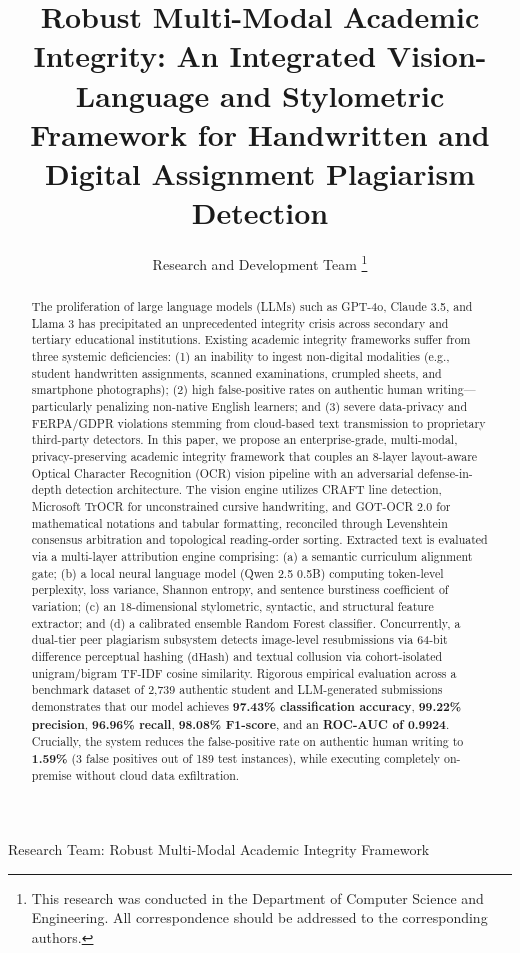 \documentclass[journal]{IEEEtran}
\begin{document}
\title{Robust Multi-Modal Academic Integrity: An Integrated Vision-Language and Stylometric Framework for Handwritten and Digital Assignment Plagiarism Detection}

\author{Research and Development Team%
\thanks{This research was conducted in the Department of Computer Science and Engineering. All correspondence should be addressed to the corresponding authors.}
}

%
{Research Team: Robust Multi-Modal Academic Integrity Framework}

\maketitle

\begin{abstract}
The proliferation of large language models (LLMs) such as GPT-4o, Claude 3.5, and Llama 3 has precipitated an unprecedented integrity crisis across secondary and tertiary educational institutions. Existing academic integrity frameworks suffer from three systemic deficiencies: (1) an inability to ingest non-digital modalities (e.g., student handwritten assignments, scanned examinations, crumpled sheets, and smartphone photographs); (2) high false-positive rates on authentic human writing---particularly penalizing non-native English learners; and (3) severe data-privacy and FERPA/GDPR violations stemming from cloud-based text transmission to proprietary third-party detectors. In this paper, we propose an enterprise-grade, multi-modal, privacy-preserving academic integrity framework that couples an 8-layer layout-aware Optical Character Recognition (OCR) vision pipeline with an adversarial defense-in-depth detection architecture. The vision engine utilizes CRAFT line detection, Microsoft TrOCR for unconstrained cursive handwriting, and GOT-OCR 2.0 for mathematical notations and tabular formatting, reconciled through Levenshtein consensus arbitration and topological reading-order sorting. Extracted text is evaluated via a multi-layer attribution engine comprising: (a) a semantic curriculum alignment gate; (b) a local neural language model (Qwen 2.5 0.5B) computing token-level perplexity, loss variance, Shannon entropy, and sentence burstiness coefficient of variation; (c) an 18-dimensional stylometric, syntactic, and structural feature extractor; and (d) a calibrated ensemble Random Forest classifier. Concurrently, a dual-tier peer plagiarism subsystem detects image-level resubmissions via 64-bit difference perceptual hashing ($\text{dHash}$) and textual collusion via cohort-isolated unigram/bigram TF-IDF cosine similarity. Rigorous empirical evaluation across a benchmark dataset of 2,739 authentic student and LLM-generated submissions demonstrates that our model achieves \textbf{97.43\% classification accuracy}, \textbf{99.22\% precision}, \textbf{96.96\% recall}, \textbf{98.08\% F1-score}, and an \textbf{ROC-AUC of 0.9924}. Crucially, the system reduces the false-positive rate on authentic human writing to \textbf{1.59\%} (3 false positives out of 189 test instances), while executing completely on-premise without cloud data exfiltration.
\end{abstract}
\end{document}
